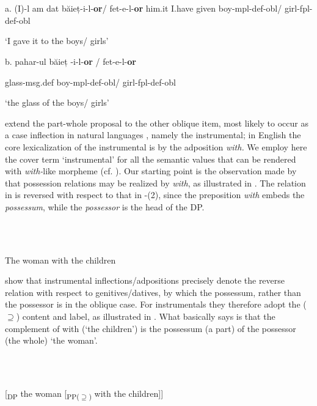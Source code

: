 \documentclass[output=paper]{langsci/langscibook}
\begin{document}
\ea%
    \label{ex:key:3}
    \gll\\
        \\
    \glt
    \z

          a.   (I)-l   am   dat   băieț-i-l-\textbf{or}/     fet-e-l-\textbf{or}     him.it   I.have given   boy-mpl-def-obl/  girl-fpl-def-obl


‘I gave it to the boys/ girls’

b. pahar-ul     băieț -i-l-\textbf{or} /    fet-e-l-\textbf{or} 

glass-msg.def   boy-mpl-def-obl/  girl-fpl-def-obl 

‘the glass of the boys/ girls’ 

\citet{FrancoManzini2017b} extend the part-whole proposal to the other oblique item, most likely to occur as a case inflection in natural languages \citep{Caha2009}, namely the instrumental; in English the core lexicalization of the instrumental is by the adposition \textit{with.} We employ here the cover term ‘instrumental’ for all the semantic values that can be rendered with \textit{with-}like morpheme (cf. \citealt{StolzEtAl2006}). Our starting point is the observation made by \citet{Levinson2011} that possession relations may be realized by \textit{with}, as illustrated in . The relation in  is reversed with respect to that in -(2), since the preposition \textit{with} embeds the \textit{possessum}, while the \textit{possessor} is the head of the DP.

\ea%
    \label{ex:key:4}
    \gll\\
        \\
    \glt
    \z

           The woman with the children

\citet{FrancoManzini2017b} show that instrumental inflections/adpositions precisely denote the reverse relation with respect to genitives/datives, by which the possessum, rather than the possessor is in the oblique case. For instrumentals they therefore adopt the (${\supseteq}$) content and label, as illustrated in . What  basically says is that the complement of with (‘the children’) is the possessum (a part) of the possessor (the whole) ‘the woman’.

\ea%
    \label{ex:key:5}
    \gll\\
        \\
    \glt
    \z

           [\textsubscript{DP} the woman [\textsubscript{PP(${\supseteq}$)} with the children]]
\end{document}
